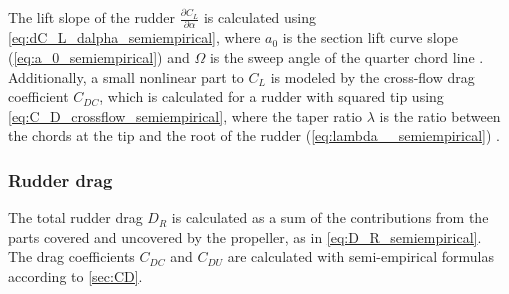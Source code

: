 The lift slope of the rudder $\frac{\partial C_L}{\partial \alpha}$ is calculated using \autoref{eq:dC_L_dalpha_semiempirical}, where $a_0$ is the section lift curve slope (\autoref{eq:a_0_semiempirical}) and $\Omega$ is the sweep angle of the quarter chord line \cite{lewis_principles_1989}.
\begin{equation}
    \label{eq:dC_L_dalpha_semiempirical}
    
\end{equation}
%
%
\begin{equation}
    \label{eq:a_0_semiempirical}
    
\end{equation}
%
Additionally, a small nonlinear part to $C_L$ is modeled by the cross-flow drag coefficient $C_{DC}$, which is calculated for a rudder with squared tip using \autoref{eq:C_D_crossflow_semiempirical}, where the taper ratio $\lambda$ is the ratio between the chords at the tip and the root of the rudder (\autoref{eq:lambda__semiempirical}) \cite{hughes_tempest_2011}. 
\begin{equation}
    \label{eq:C_D_crossflow_semiempirical}
    
\end{equation}
%
\begin{equation}
    \label{eq:lambda__semiempirical}
    
\end{equation}
%
%
\subsubsection{Rudder drag}
\label{sec:rudder_drag}
The total rudder drag $D_R$ is calculated as a sum of the contributions from the parts covered and uncovered by the propeller, as in \autoref{eq:D_R_semiempirical}.
\begin{equation}
    \label{eq:D_R_semiempirical}
    
\end{equation}
The drag coefficients $C_{DC}$ and $C_{DU}$ are calculated with semi-empirical formulas according to \ref{sec:CD}.

